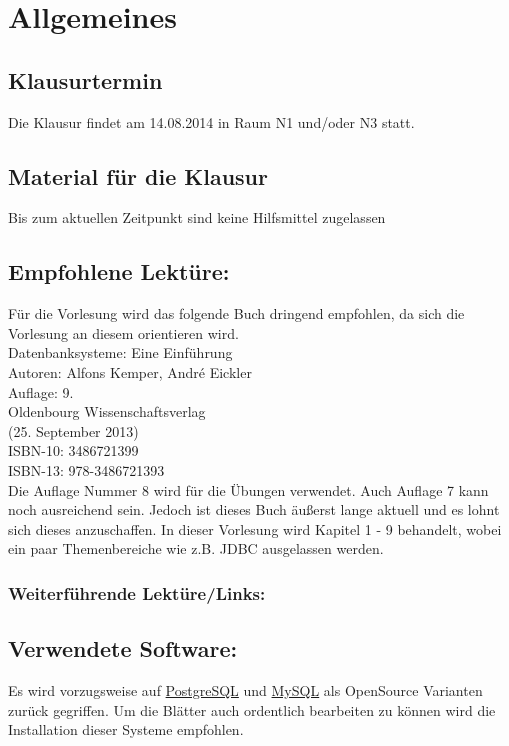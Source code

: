 \chapter{Allgemeines}
\section{Klausurtermin}
Die Klausur findet am 14.08.2014 in Raum N1 und/oder N3 statt.

\section{Material für die Klausur}
Bis zum aktuellen Zeitpunkt sind keine Hilfsmittel zugelassen
%
\section{Empfohlene Lektüre:}
Für die Vorlesung wird das folgende Buch dringend empfohlen, da sich die Vorlesung an diesem orientieren wird. \\

Datenbanksysteme: Eine Einführung\\
 Autoren: Alfons Kemper, André Eickler\\
 Auflage: 9.\\
 Oldenbourg Wissenschaftsverlag\\
(25. September 2013)\\
ISBN-10: 3486721399\\
ISBN-13: 978-3486721393\\

Die Auflage Nummer 8 wird für die Übungen verwendet. Auch Auflage 7 kann noch ausreichend sein. Jedoch ist dieses Buch äußerst lange aktuell und es lohnt sich dieses anzuschaffen. In dieser Vorlesung wird Kapitel 1 - 9 behandelt, wobei ein paar Themenbereiche wie z.B. JDBC ausgelassen werden. 

\subsection{Weiterführende Lektüre/Links:}

\section{Verwendete Software:}
Es wird vorzugsweise auf \href{http://www.postgresql.org/}{PostgreSQL} und \href{http://www.mysql.de/}{MySQL} als OpenSource Varianten zurück gegriffen. Um die Blätter auch ordentlich bearbeiten zu können wird die Installation dieser Systeme empfohlen. 